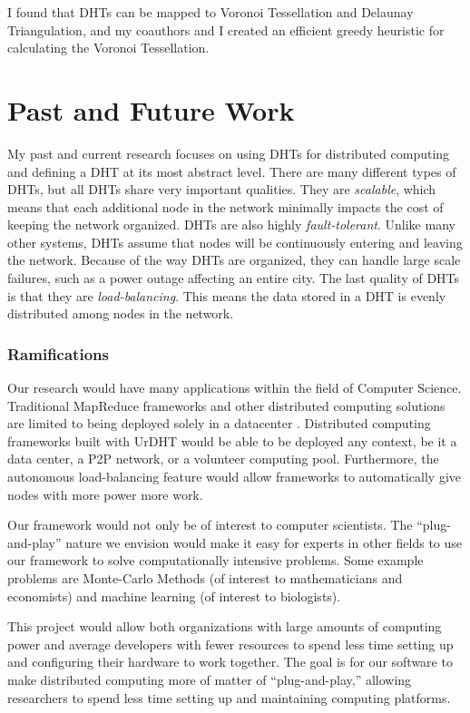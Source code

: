 \documentclass[10pt, a4paper]{article}
\begin{document}
I found that DHTs can be mapped to Voronoi Tessellation and Delaunay Triangulation, and my coauthors and I created an efficient greedy heuristic for calculating the Voronoi Tessellation.


\section{Past and Future Work}


My past and current research focuses on using DHTs for distributed computing \cite{chordreduce} and defining a DHT at its most abstract level.
There are many different types of DHTs, but all DHTs share very important qualities.
They are \textit{scalable}, which means that each additional node in the network minimally impacts the cost of keeping the network organized.
DHTs are also highly \textit{fault-tolerant}.
Unlike many other systems, DHTs assume that nodes will be continuously entering and leaving the network.
Because of the way DHTs are organized, they can handle large scale failures, such as a power outage affecting an entire city.
The last quality of DHTs is that they are \textit{load-balancing}. 
This means the data stored in a DHT is evenly distributed among nodes in the network.




\subsubsection*{Ramifications}
Our research would have many applications within the field of Computer Science.
Traditional MapReduce frameworks and other distributed computing solutions are limited to being deployed solely in a datacenter \cite{hadoopAssumptions}.
Distributed computing frameworks built with UrDHT would be able to be deployed any context, be it a data center, a P2P network, or a volunteer computing pool.
Furthermore, the autonomous load-balancing feature would allow frameworks to automatically give nodes with more power more work.

Our framework would not only be of interest to computer scientists.
The ``plug-and-play'' nature we envision would make it easy for experts in other fields to use our framework to solve computationally intensive problems.
Some example problems are Monte-Carlo Methods (of interest to mathematicians and economists) and machine learning (of interest to biologists).

This project would allow both organizations with large amounts of computing power and average developers with  fewer resources to spend less time setting up and configuring their hardware to work together.  
The goal is for our software to make distributed computing more of matter of ``plug-and-play,'' allowing researchers to spend less time setting up and maintaining  computing platforms.
\end{document}
